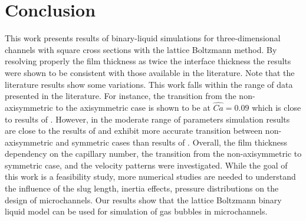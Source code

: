 \documentclass[preprint,12pt]{elsarticle}
\begin{document}
\section{Conclusion}
This work presents results of binary-liquid simulations for three-dimensional channels with square
cross sections with the lattice Boltzmann method. By resolving properly the film thickness as twice the
interface thickness \cite{kuzmin-binary2d} the results were shown to be consistent with those
available in the literature. Note that the literature results show some variations. This work falls
within the range of data presented in the literature. For instance, the  transition from the
non-axisymmetric to the
axisymmetric case is shown to be at $\widehat{Ca}=0.09$ which is close to results of
\citet{wang-non-circular}. However, in the moderate range of parameters simulation results are
close to the results of \citet{heil-threedim} and exhibit more accurate transition between
non-axisymmetric and symmetric cases than results of \citet{wang-non-circular}. Overall, the film
thickness dependency on the capillary number, the
transition from the non-axisymmetric to symmetric case, and the velocity patterns were investigated.
While
the goal of this work is a feasibility study, more numerical studies are needed to
understand the influence of the slug length, inertia effects, pressure distributions
\cite{kreutzer-taylor,yue-mass} on the design of microchannels. Our results show that the lattice
Boltzmann binary liquid model can be used for simulation of gas bubbles in microchannels. 

\appendix
\end{document}
